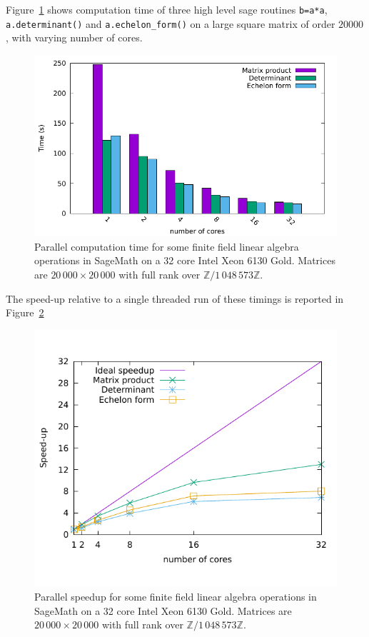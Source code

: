\documentclass{deliverablereport}
\begin{document}
Figure~\ref{fig:histo_sage} shows computation time of three high level sage routines
  \texttt{b=a*a},  \texttt{a.determinant()} and \texttt{a.echelon\_form()} on a large square matrix of
order $20000$, with varying number of cores.
\begin{figure}[htb]
  \begin{center}
    \includegraphics[width=.8\textwidth]{Pictures/histo_bigfoot3}
    \caption{Parallel computation time for some finite field linear algebra operations in SageMath on a 32 core Intel
      Xeon 6130 Gold. Matrices are $20\,000\times 20\,000$ with full rank over $\mathbb{Z}/1\,048\,573\mathbb{Z}$. }
    \label{fig:histo_sage}
  \end{center}
\end{figure}
The speed-up relative to a single threaded run of these timings is reported in Figure~\ref{fig:speedup_sage}
\begin{figure}[htb]
  \begin{center}
    \includegraphics[width=.7\textwidth]{Pictures/speedup_bigfoot3}
    \caption{Parallel speedup for some finite field linear algebra operations in SageMath on a 32 core Intel
      Xeon 6130 Gold. Matrices are $20\,000\times 20\,000$ with full rank over $\mathbb{Z}/1\,048\,573\mathbb{Z}$.}
    \label{fig:speedup_sage}
  \end{center}
\end{figure}
\end{document}
